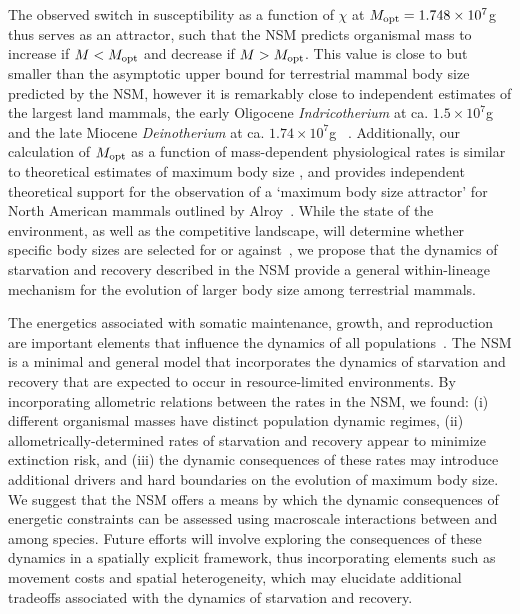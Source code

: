 \documentclass[twocolumn,preprintnumbers,amsmath,amssymb,superscriptaddress]{revtex4}
\begin{document}
\begin{bibunit}[unsrt]
The observed switch in susceptibility as a function of $\chi$ at $M_{\rm opt}= 1.748\times10^7$g thus serves as an attractor, such that the NSM predicts organismal mass to increase if $M<M_{\rm opt}$ and decrease if $M>M_{\rm opt}$.
This value is close to but smaller than the asymptotic upper bound for terrestrial mammal body size predicted by the NSM, however it is remarkably close to independent estimates of the largest land mammals, the early Oligocene \emph{Indricotherium} at ca. $1.5\times10^7$g and the late Miocene \emph{Deinotherium} at ca. $1.74\times10^7$g ~\cite{Smith:2010p3442}.
Additionally, our calculation of $M_{\rm opt}$ as a function of mass-dependent physiological rates is similar to theoretical estimates of maximum body size \cite{Clauset:2009fh}, and provides independent theoretical support for the observation of a `maximum body size attractor' for North American mammals outlined by Alroy~\cite{Alroy:1998p1594}.
While the state of the environment, as well as the competitive landscape, will determine whether specific body sizes are selected for or against~\cite{Saarinen:2014br}, we propose that the dynamics of starvation and recovery described in the NSM provide a general within-lineage mechanism for the evolution of larger body size among terrestrial mammals.


The energetics associated with somatic maintenance, growth, and reproduction are important elements that influence the dynamics of all populations~\cite{Stearns:1989ip}.
The NSM is a minimal and general model that incorporates the dynamics of starvation and recovery that are expected to occur in resource-limited environments.
By incorporating allometric relations between the rates in the NSM, we found: (i) different organismal masses have distinct population dynamic regimes, (ii) allometrically-determined rates of starvation and recovery appear to minimize extinction risk, and (iii) the dynamic consequences of these rates may introduce additional drivers and hard boundaries on the evolution of maximum body size.
We suggest that the NSM offers a means by which the dynamic consequences of energetic constraints can be assessed using macroscale interactions between and among species.
Future efforts will involve exploring the consequences of these dynamics in a spatially explicit framework, thus incorporating elements such as movement costs and spatial heterogeneity, which may elucidate additional tradeoffs associated with the dynamics of starvation and recovery.




\end{bibunit}
\end{document}
